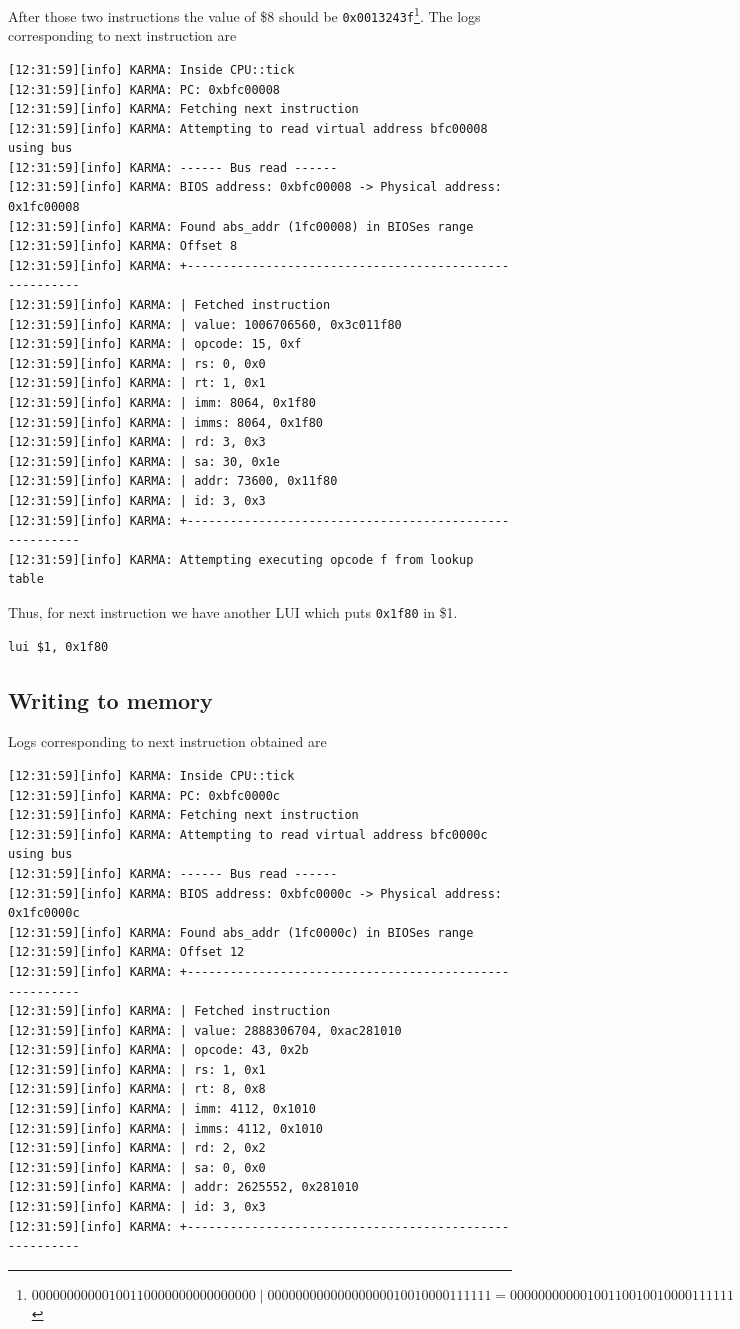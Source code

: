 \documentclass[a4paper]{article}
\newcommand{\code}[1] {\texttt{#1}}
\begin{document}
After those two instructions the value of \$8 should be
\code{0x0013243f}\footnote{$00000000000100110000000000000000 \mid 00000000000000000010010000111111 = 00000000000100110010010000111111$}. The logs corresponding to next instruction are

\begin{verbatim}
[12:31:59][info] KARMA: Inside CPU::tick
[12:31:59][info] KARMA: PC: 0xbfc00008
[12:31:59][info] KARMA: Fetching next instruction
[12:31:59][info] KARMA: Attempting to read virtual address bfc00008 using bus
[12:31:59][info] KARMA: ------ Bus read ------
[12:31:59][info] KARMA: BIOS address: 0xbfc00008 -> Physical address: 0x1fc00008
[12:31:59][info] KARMA: Found abs_addr (1fc00008) in BIOSes range
[12:31:59][info] KARMA: Offset 8
[12:31:59][info] KARMA: +-------------------------------------------------------
[12:31:59][info] KARMA: | Fetched instruction 
[12:31:59][info] KARMA: | value: 1006706560, 0x3c011f80
[12:31:59][info] KARMA: | opcode: 15, 0xf
[12:31:59][info] KARMA: | rs: 0, 0x0
[12:31:59][info] KARMA: | rt: 1, 0x1
[12:31:59][info] KARMA: | imm: 8064, 0x1f80
[12:31:59][info] KARMA: | imms: 8064, 0x1f80
[12:31:59][info] KARMA: | rd: 3, 0x3
[12:31:59][info] KARMA: | sa: 30, 0x1e
[12:31:59][info] KARMA: | addr: 73600, 0x11f80
[12:31:59][info] KARMA: | id: 3, 0x3
[12:31:59][info] KARMA: +-------------------------------------------------------
[12:31:59][info] KARMA: Attempting executing opcode f from lookup table
\end{verbatim}

Thus, for next instruction we have another LUI which puts \code{0x1f80} in \$1.

\begin{lstlisting}[language=assembly, label={asm:lui1f80}]
lui $1, 0x1f80
\end{lstlisting}

\subsection{Writing to memory}
Logs corresponding to next instruction obtained are
\begin{verbatim}
[12:31:59][info] KARMA: Inside CPU::tick
[12:31:59][info] KARMA: PC: 0xbfc0000c
[12:31:59][info] KARMA: Fetching next instruction
[12:31:59][info] KARMA: Attempting to read virtual address bfc0000c using bus
[12:31:59][info] KARMA: ------ Bus read ------
[12:31:59][info] KARMA: BIOS address: 0xbfc0000c -> Physical address: 0x1fc0000c
[12:31:59][info] KARMA: Found abs_addr (1fc0000c) in BIOSes range
[12:31:59][info] KARMA: Offset 12
[12:31:59][info] KARMA: +-------------------------------------------------------
[12:31:59][info] KARMA: | Fetched instruction 
[12:31:59][info] KARMA: | value: 2888306704, 0xac281010
[12:31:59][info] KARMA: | opcode: 43, 0x2b
[12:31:59][info] KARMA: | rs: 1, 0x1
[12:31:59][info] KARMA: | rt: 8, 0x8
[12:31:59][info] KARMA: | imm: 4112, 0x1010
[12:31:59][info] KARMA: | imms: 4112, 0x1010
[12:31:59][info] KARMA: | rd: 2, 0x2
[12:31:59][info] KARMA: | sa: 0, 0x0
[12:31:59][info] KARMA: | addr: 2625552, 0x281010
[12:31:59][info] KARMA: | id: 3, 0x3
[12:31:59][info] KARMA: +-------------------------------------------------------
\end{verbatim}
\end{document}
